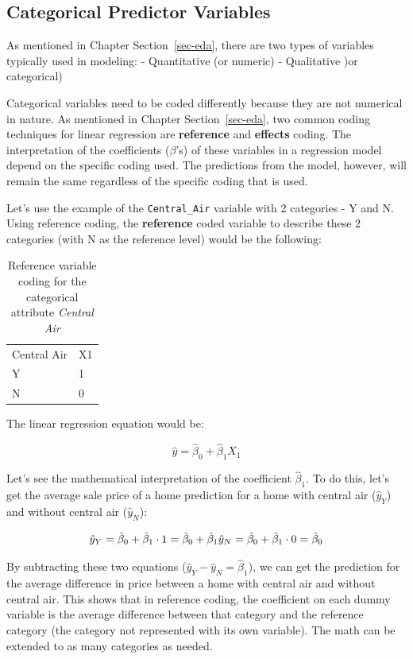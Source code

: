 \documentclass[
  letterpaper,
  DIV=11,
  numbers=noendperiod]{scrreprt}
\begin{document}
\hypertarget{categorical-predictor-variables}{%
\subsection{Categorical Predictor
Variables}\label{categorical-predictor-variables}}

As mentioned in Chapter Section~\ref{sec-eda}, there are two types of
variables typically used in modeling: - Quantitative (or numeric) -
Qualitative )or categorical)

Categorical variables need to be coded differently because they are not
numerical in nature. As mentioned in Chapter Section~\ref{sec-eda}, two
common coding techniques for linear regression are \textbf{reference}
and \textbf{effects} coding. The interpretation of the coefficients
(\(\beta\)'s) of these variables in a regression model depend on the
specific coding used. The predictions from the model, however, will
remain the same regardless of the specific coding that is used.

Let's use the example of the \texttt{Central\_Air} variable with 2
categories - Y and N. Using reference coding, the \textbf{reference}
coded variable to describe these 2 categories (with N as the reference
level) would be the following:

\hypertarget{tbl-centralair}{}
\begin{longtable}[]{@{}ll@{}}
\caption{\label{tbl-centralair}Reference variable coding for the
categorical attribute \emph{Central Air}}\tabularnewline
\toprule()
\endhead
Central Air & X1 \\
Y & 1 \\
N & 0 \\
\bottomrule()
\end{longtable}

The linear regression equation would be:

\[
\hat{y} = \hat{\beta}_0 + \hat{\beta}_1 X_1
\]

Let's see the mathematical interpretation of the coefficient
\(\hat{\beta}_1\). To do this, let's get the average sale price of a
home prediction for a home with central air (\(\hat{y}_Y\)) and without
central air (\(\hat{y}_N\)):

\[
\hat{y}_Y = \hat{\beta}_0 + \hat{\beta}_1 \cdot 1 = \hat{\beta}_0 + \hat{\beta}_1 \\
\hat{y}_N = \hat{\beta}_0 + \hat{\beta}_1 \cdot 0 = \hat{\beta}_0
\]

By subtracting these two equations
(\(\hat{y}_Y - \hat{y}_N = \hat{\beta}_1\)), we can get the prediction
for the average difference in price between a home with central air and
without central air. This shows that in reference coding, the
coefficient on each dummy variable is the average difference between
that category and the reference category (the category not represented
with its own variable). The math can be extended to as many categories
as needed.
\end{document}
